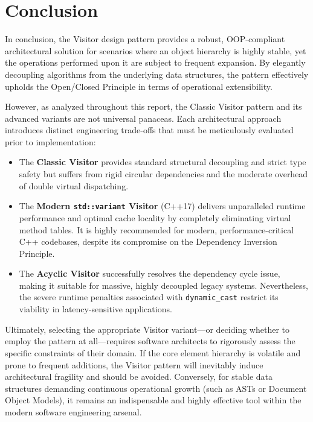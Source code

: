 \section{Conclusion}
\label{sec:conclusion}

In conclusion, the Visitor design pattern provides a robust, OOP-compliant architectural solution for scenarios where an object hierarchy is highly stable, yet the operations performed upon it are subject to frequent expansion. By elegantly decoupling algorithms from the underlying data structures, the pattern effectively upholds the Open/Closed Principle in terms of operational extensibility.

However, as analyzed throughout this report, the Classic Visitor pattern and its advanced variants are not universal panaceas. Each architectural approach introduces distinct engineering trade-offs that must be meticulously evaluated prior to implementation:

\begin{itemize}
    \item The \textbf{Classic Visitor} provides standard structural decoupling and strict type safety but suffers from rigid circular dependencies and the moderate overhead of double virtual dispatching.
    \item The \textbf{Modern \texttt{std::variant} Visitor} (C++17) delivers unparalleled runtime performance and optimal cache locality by completely eliminating virtual method tables. It is highly recommended for modern, performance-critical C++ codebases, despite its compromise on the Dependency Inversion Principle.
    \item The \textbf{Acyclic Visitor} successfully resolves the dependency cycle issue, making it suitable for massive, highly decoupled legacy systems. Nevertheless, the severe runtime penalties associated with \texttt{dynamic\_cast} restrict its viability in latency-sensitive applications.
\end{itemize}

Ultimately, selecting the appropriate Visitor variant—or deciding whether to employ the pattern at all—requires software architects to rigorously assess the specific constraints of their domain. If the core element hierarchy is volatile and prone to frequent additions, the Visitor pattern will inevitably induce architectural fragility and should be avoided. Conversely, for stable data structures demanding continuous operational growth (such as ASTs or Document Object Models), it remains an indispensable and highly effective tool within the modern software engineering arsenal.